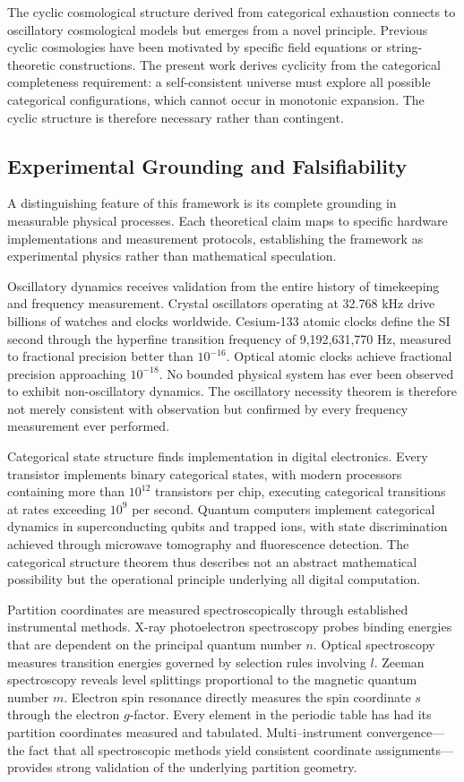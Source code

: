 \documentclass[11pt,a4paper]{article}
\theoremstyle{remark}
\begin{document}
The cyclic cosmological structure derived from categorical exhaustion connects to oscillatory cosmological models but emerges from a novel principle. Previous cyclic cosmologies have been motivated by specific field equations or string-theoretic constructions. The present work derives cyclicity from the categorical completeness requirement: a self-consistent universe must explore all possible categorical configurations, which cannot occur in monotonic expansion. The cyclic structure is therefore necessary rather than contingent.

\subsection{Experimental Grounding and Falsifiability}

A distinguishing feature of this framework is its complete grounding in measurable physical processes. Each theoretical claim maps to specific hardware implementations and measurement protocols, establishing the framework as experimental physics rather than mathematical speculation.

Oscillatory dynamics receives validation from the entire history of timekeeping and frequency measurement. Crystal oscillators operating at 32.768 kHz drive billions of watches and clocks worldwide. Cesium-133 atomic clocks define the SI second through the hyperfine transition frequency of 9,192,631,770 Hz, measured to fractional precision better than $10^{-16}$. Optical atomic clocks achieve fractional precision approaching $10^{-18}$. No bounded physical system has ever been observed to exhibit non-oscillatory dynamics. The oscillatory necessity theorem is therefore not merely consistent with observation but confirmed by every frequency measurement ever performed.

Categorical state structure finds implementation in digital electronics. Every transistor implements binary categorical states, with modern processors containing more than $10^{12}$ transistors per chip, executing categorical transitions at rates exceeding $10^9$ per second. Quantum computers implement categorical dynamics in superconducting qubits and trapped ions, with state discrimination achieved through microwave tomography and fluorescence detection. The categorical structure theorem thus describes not an abstract mathematical possibility but the operational principle underlying all digital computation.

Partition coordinates are measured spectroscopically through established instrumental methods. X-ray photoelectron spectroscopy probes binding energies that are dependent on the principal quantum number $n$. Optical spectroscopy measures transition energies governed by selection rules involving $l$. Zeeman spectroscopy reveals level splittings proportional to the magnetic quantum number $m$. Electron spin resonance directly measures the spin coordinate $s$ through the electron $g$-factor. Every element in the periodic table has had its partition coordinates measured and tabulated. Multi--instrument convergence—the fact that all spectroscopic methods yield consistent coordinate assignments—provides strong validation of the underlying partition geometry.
\end{document}
